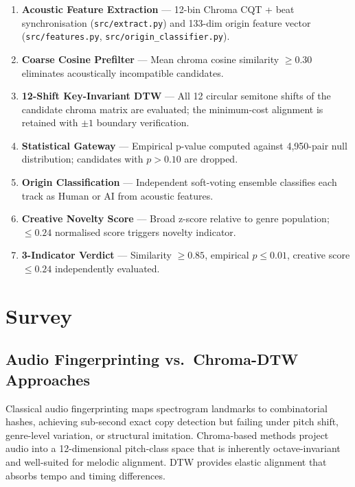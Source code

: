 \documentclass[12pt,a4paper]{article}
\begin{document}
\begin{enumerate}[noitemsep,label=\arabic*.]
  \item \textbf{Acoustic Feature Extraction} --- 12-bin Chroma CQT + beat
        synchronisation (\texttt{src/extract.py}) and 133-dim origin feature
        vector (\texttt{src/features.py}, \texttt{src/origin\_classifier.py}).
  \item \textbf{Coarse Cosine Prefilter} --- Mean chroma cosine similarity
        $\geq 0.30$ eliminates acoustically incompatible candidates.
  \item \textbf{12-Shift Key-Invariant DTW} --- All 12 circular semitone
        shifts of the candidate chroma matrix are evaluated; the minimum-cost
        alignment is retained with $\pm 1$ boundary verification.
  \item \textbf{Statistical Gateway} --- Empirical p-value computed against
        4,950-pair null distribution; candidates with $p > 0.10$ are dropped.
  \item \textbf{Origin Classification} --- Independent soft-voting ensemble
        classifies each track as Human or AI from acoustic features.
  \item \textbf{Creative Novelty Score} --- Broad z-score relative to genre
        population; $\leq 0.24$ normalised score triggers novelty indicator.
  \item \textbf{3-Indicator Verdict} --- Similarity $\geq 0.85$, empirical
        $p \leq 0.01$, creative score $\leq 0.24$ independently evaluated.
\end{enumerate}

\section{Survey}
\label{sec:survey}

\subsection{Audio Fingerprinting vs.\ Chroma-DTW Approaches}

Classical audio fingerprinting \cite{wang2003industrial} maps spectrogram
landmarks to combinatorial hashes, achieving sub-second exact copy detection
but failing under pitch shift, genre-level variation, or structural imitation.
Chroma-based methods \cite{muller2015fundamentals} project audio into a
12-dimensional pitch-class space that is inherently octave-invariant and
well-suited for melodic alignment. DTW \cite{sakoe1978dynamic} provides
elastic alignment that absorbs tempo and timing differences.
\end{document}
